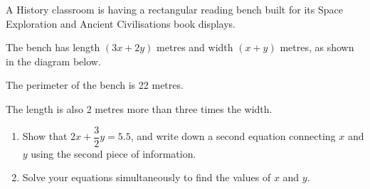 \begin{question}
\noindent A History classroom is having a rectangular reading bench built for its Space Exploration and Ancient Civilisations book displays.

The bench has length $(3x + 2y)$ metres and width $(x + y)$ metres, as shown in the diagram below.

\begin{center}
\end{center}

\noindent The perimeter of the bench is 22 metres.

\noindent The length is also 2 metres more than three times the width.

\begin{enumerate}
    \item[(a)] Show that $2x + \dfrac{3}{2}y = 5.5$, and write down a second equation connecting $x$ and $y$ using the second piece of information.
    \vspace{3cm}

    \item[(b)] Solve your equations simultaneously to find the values of $x$ and $y$.
    \vspace{4cm}
\end{enumerate}
\end{question}

